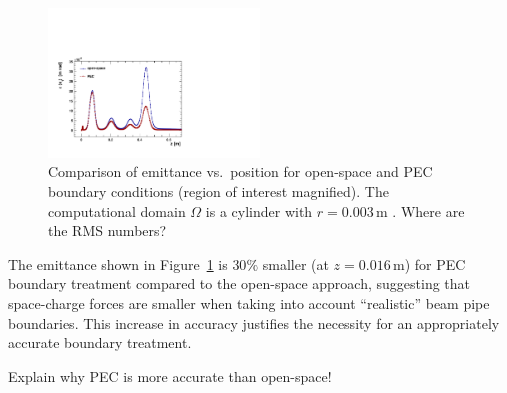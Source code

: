 \begin{figure}[ht]
  \begin{center}
    \includegraphics[width=0.5\textwidth]{figures/os_vs_pec_varepsilon_x_gun.pdf}
    \caption{Comparison of emittance vs.\ position for open-space and
      PEC boundary conditions (region of interest magnified). The
      computational domain $\Omega$ is a cylinder with
      $r=0.003$\,m \label{fig:vareps}.  {\color{red}Where are the RMS
        numbers?}}
  \end{center} 
\end{figure}


The emittance shown in Figure~\ref{fig:vareps} is $30\%$ smaller (at
$z=0.016$\,m) for PEC boundary treatment compared to the open-space
approach, suggesting that space-charge forces are smaller when taking
into account ``realistic'' beam pipe boundaries.
This increase in accuracy justifies the necessity for an appropriately
accurate boundary treatment.

{\color{red}Explain why PEC is more accurate than open-space!}

